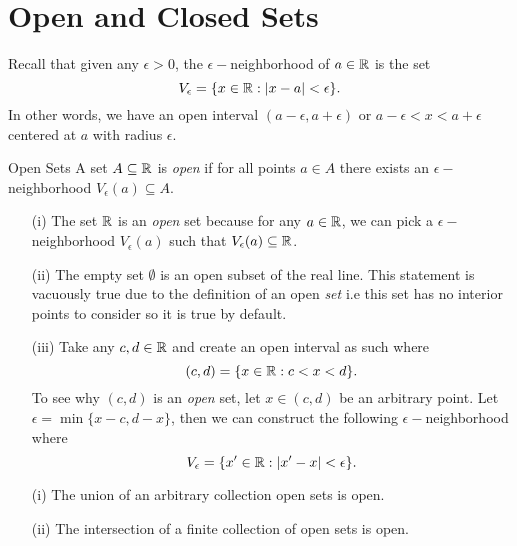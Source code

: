 

\section{Open and Closed Sets}

Recall that given any \( \epsilon >0 \), the \( \epsilon-\)neighborhood of \( a \in \mathbb{R}  \) is the set 
\[ V_{\epsilon } = \{ x \in \mathbb{R} : | x - a | < \epsilon  \}.\]
In other words, we have an open interval \( (a -\epsilon , a + \epsilon ) \) or \( a - \epsilon < x < a + \epsilon  \) centered at \( a \) with radius \( \epsilon  \). 

\begin{definition}{Open Sets}{}
    A set \( A \subseteq \mathbb{R}  \) is \textit{open} if for all points \( a \in A \) there exists an \( \epsilon - \)neighborhood \(  V_{\epsilon }(a) \subseteq A \). 
\end{definition}


\begin{example}{}{}
\begin{enumerate}
    \item[(i)] The set \( \mathbb{R}  \) is an \textit{open} set because for any \( a \in \mathbb{R}  \), we can pick a \( \epsilon- \)neighborhood \( V_{\epsilon }(a) \) such that \( V_{\epsilon } (a) \subseteq \mathbb{R} \). 
    \item[(ii)] The empty set \( \emptyset \) is an open subset of the real line. This statement is vacuously true due to the definition of an open \textit{set} i.e this set has no interior points to consider so it is true by default. 
    \item[(iii)] Take any \( c,d \in \mathbb{R}  \) and create an open interval as such where 
        \[  (c,d) = \{ x \in \mathbb{R} : c < x < d \}.\] To see why \( (c,d) \) is an \textit{open} set, let \( x \in (c,d) \) be an arbitrary point. Let \(  \epsilon = \min\{ x - c, d -x  \}  \), then we can construct the following \( \epsilon-\)neighborhood where
        \[  V_{\epsilon} = \{ x' \in \mathbb{R} : | x' - x  | < \epsilon \}.  \]
\end{enumerate}
\end{example}

\begin{theorem}{}{}
\begin{enumerate}
    \item[(i)] The union of an arbitrary collection open sets is open.
    \item[(ii)] The intersection of a finite collection of open sets is open. 
\end{enumerate}
\end{theorem}


